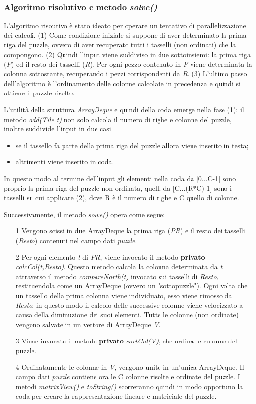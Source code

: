 \documentclass{article}
\begin{document}
\subsubsection{Algoritmo risolutivo e metodo \textit{solve()}}
L'algoritmo risoutivo è stato ideato per operare un tentativo di parallelizzazione dei calcoli. (1) Come condizione iniziale si suppone di aver determinato la prima riga del puzzle, ovvero di aver recuperato tutti i tasselli (non ordinati) che la compongono. (2) Quindi l'input viene suddiviso in due sottoinsiemi: la prima riga (\textit{P}) ed  il resto dei tasselli (\textit{R}). Per ogni pezzo contenuto in \textit{P} viene determinata la colonna sottostante, recuperando i pezzi corrispondenti da \textit{R}. (3) L'ultimo passo dell'algoritmo è l'ordinamento delle colonne calcolate in precedenza e quindi si ottiene il puzzle risolto. \par
L'utilità della struttura \textit{ArrayDeque} e quindi della coda emerge nella fase (1): il metodo \textit{add(Tile t)} non solo calcola il numero di righe e colonne del puzzle, inoltre suddivide l'input in due casi
\begin{itemize}
\item se il tassello fa parte della prima riga del puzzle allora viene inserito in testa;
\item altrimenti viene inserito in coda.
\end{itemize}
In questo modo al termine dell'input gli elementi nella coda da [0...C-1] sono proprio la prima riga del puzzle non ordinata, quelli da [C...(R*C)-1] sono i tasselli su cui applicare (2), dove R è il numero di righe e C quello di colonne.\par 
Successivamente, il metodo \textit{solve()} opera come segue:
\begin{itemize}
\item[1]  Vengono scissi in due ArrayDeque la prima riga (\textit{PR}) e il resto dei tasselli (\textit{Resto}) contenuti nel campo dati \textit{puzzle}.
\item[2] Per ogni elemento \textit{t} di \textit{PR}, viene invocato il metodo \textbf{privato} \textit{calcCol(t,Resto)}. Questo metodo calcola la colonna determinata da \textit{t} attraverso il metodo \textit{compareNorth(t)} invocato sui tasselli di \textit{Resto}, restituendola come un ArrayDeque (ovvero un "sottopuzzle"). Ogni volta che un tassello della prima colonna viene individuato, esso viene rimosso da \textit{Resto}: in questo modo il calcolo delle successive colonne viene velocizzato a causa della diminuzione dei suoi elementi. Tutte le colonne (non ordinate) vengono salvate in un vettore di ArrayDeque \textit{V}.
\item[3] Viene invocato il metodo \textbf{privato} \textit{sortCol(V)}, che ordina le colonne del puzzle.
\item[4] Ordinatamente le colonne in \textit{V}, vengono unite in un'unica ArrayDeque. Il campo dati \textit{puzzle} contiene ora le C colonne risolte e ordinate del puzzle. I metodi \textit{matrixView()} e \textit{toString()} scorreranno quindi in modo opportuno la coda per creare la rappresentazione lineare e matriciale del puzzle.
\end{itemize}
\end{document}
